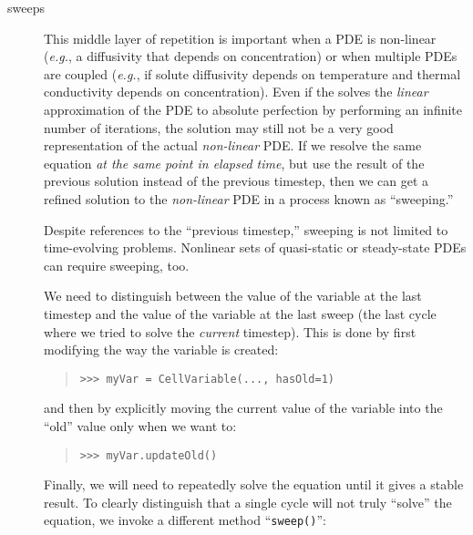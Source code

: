\begin{description}
        \item[sweeps] This middle layer of repetition is important
        when a PDE is non-linear (\emph{e.g.}, a diffusivity that
        depends on concentration) or when multiple PDEs are coupled
        (\emph{e.g.}, if solute diffusivity depends on temperature and
        thermal conductivity depends on concentration). Even if the
         solves the \emph{linear} approximation of the
        PDE to absolute perfection by performing an infinite number of
        iterations, the solution may still not be a very good
        representation of the actual \emph{non-linear} PDE. If we
        resolve the same equation \emph{at the same point in elapsed
        time}, but use the result of the previous solution instead of 
        the previous timestep, then we can get a refined solution to 
        the \emph{non-linear} PDE in a process known as ``sweeping.'' 
        \begin{reSTadmonition}[Note]
        Despite references to the ``previous timestep,'' sweeping is 
        not limited to time-evolving problems. Nonlinear sets of 
        quasi-static or steady-state PDEs can require sweeping, too.
        \end{reSTadmonition}
        We need to distinguish between the value of the variable at
        the last timestep and the value of the variable at the last
        sweep (the last cycle where we tried to solve the
        \emph{current} timestep). This is done by first modifying the
        way the variable is created:
        \begin{quote}
\begin{verbatim}
>>> myVar = CellVariable(..., hasOld=1)
\end{verbatim}
        \end{quote}
        and then by explicitly moving the current value of the 
        variable into the ``old'' value only when we want to:
        \begin{quote}
\begin{verbatim}
>>> myVar.updateOld()
\end{verbatim}
        \end{quote}
        Finally, we will need to repeatedly solve the equation until 
        it gives a stable result. To clearly distinguish that a 
        single cycle will not truly ``solve'' the equation, we invoke 
        a different method ``\verb+sweep()+'':
        \begin{quote}
\begin{verbatim}

\end{verbatim}
\end{quote}
\end{description}
